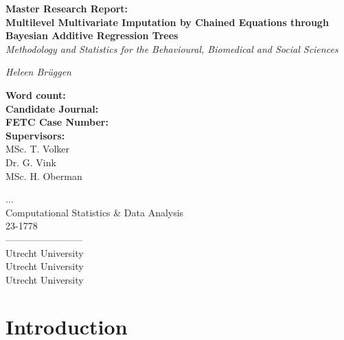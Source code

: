 \documentclass[10pt, a4paper, titlepage]{article}
\begin{document}
\begin{titlingpage}
\begin{center}
\Huge\textbf{Master Research Report:  \\ Multilevel Multivariate Imputation by Chained Equations through Bayesian Additive Regression Trees} \\
\Large\textit{Methodology and Statistics for the Behavioural, Biomedical and Social Sciences}

\vspace{.5cm}

\normalsize\textit{Heleen Brüggen}

\vspace{15cm}

\begin{minipage}{0.5\textwidth}
\begin{flushleft}

\textbf{Word count:} \\
\textbf{Candidate Journal:} \\
\textbf{FETC Case Number:} \\
\textbf{Supervisors:} \\
MSc. T. Volker \\
Dr. G. Vink \\
 MSc. H. Oberman
\end{flushleft}
\end{minipage}%
\begin{minipage}{0.5\textwidth}
\begin{flushright}

... \\
Computational Statistics \& Data Analysis \\
23-1778 \\
------------------------\\
Utrecht University \\
Utrecht University \\
Utrecht University
\end{flushright}
\end{minipage}

\end{center}
\end{titlingpage}

\newpage

\section{Introduction}
\end{document}
